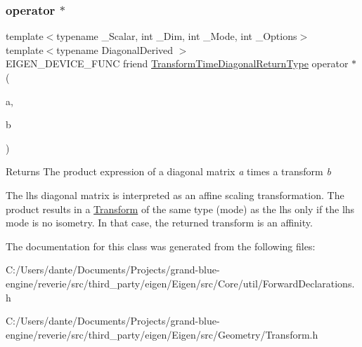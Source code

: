 \subsubsection{\texorpdfstring{operator $\ast$}{operator *}\hspace{0.1cm}{\footnotesize\ttfamily [2/2]}}
{\footnotesize\ttfamily template$<$typename \+\_\+\+Scalar, int \+\_\+\+Dim, int \+\_\+\+Mode, int \+\_\+\+Options$>$ \\
template$<$typename Diagonal\+Derived $>$ \\
E\+I\+G\+E\+N\+\_\+\+D\+E\+V\+I\+C\+E\+\_\+\+F\+U\+NC friend \mbox{\hyperlink{class_eigen_1_1_transform_a51af5e8d8d9d9bfec091ff8aa5b7845a}{Transform\+Time\+Diagonal\+Return\+Type}} operator $\ast$ (\begin{DoxyParamCaption}\item[{const \mbox{\hyperlink{class_eigen_1_1_diagonal_base}{Diagonal\+Base}}$<$ Diagonal\+Derived $>$ \&}]{a,  }\item[{const \mbox{\hyperlink{class_eigen_1_1_transform}{Transform}}$<$ \+\_\+\+Scalar, \+\_\+\+Dim, \+\_\+\+Mode, \+\_\+\+Options $>$ \&}]{b }\end{DoxyParamCaption})\hspace{0.3cm}{\ttfamily [friend]}}

\begin{DoxyReturn}{Returns}
The product expression of a diagonal matrix {\itshape a} times a transform {\itshape b} 
\end{DoxyReturn}
The lhs diagonal matrix is interpreted as an affine scaling transformation. The product results in a \mbox{\hyperlink{class_eigen_1_1_transform}{Transform}} of the same type (mode) as the lhs only if the lhs mode is no isometry. In that case, the returned transform is an affinity. 

The documentation for this class was generated from the following files\+:\begin{DoxyCompactItemize}
\item 
C\+:/\+Users/dante/\+Documents/\+Projects/grand-\/blue-\/engine/reverie/src/third\+\_\+party/eigen/\+Eigen/src/\+Core/util/Forward\+Declarations.\+h\item 
C\+:/\+Users/dante/\+Documents/\+Projects/grand-\/blue-\/engine/reverie/src/third\+\_\+party/eigen/\+Eigen/src/\+Geometry/Transform.\+h\end{DoxyCompactItemize}
